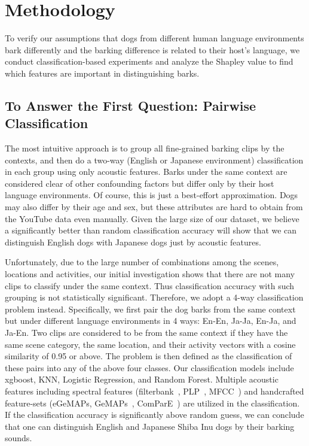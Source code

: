 \section{Methodology}
\label{sec:method}
To verify our assumptions that dogs from different human language environments bark differently and the barking difference is related to their host's language, we conduct classification-based experiments and analyze the Shapley value to find which features are important in distinguishing barks. %

\subsection{To Answer the First Question: Pairwise Classification}

The most intuitive approach is to group all fine-grained barking clips by the contexts, and then
do a two-way (English or Japanese environment) classification in each group using only 
acoustic features.  Barks under the same context are considered clear of other 
confounding factors but differ only by their host language environments. 
Of course, this is just a best-effort approximation. Dogs may also differ by their
age and sex, but these attributes are hard to obtain from the YouTube data even manually.
Given the large size of our dataset, we believe a significantly better than random classification
accuracy will show that we can distinguish English dogs with Japanese dogs just 
by acoustic features.  

Unfortunately, due to the large number of combinations among the scenes, locations and 
activities, our initial investigation shows that there are not many clips to classify 
under the same context. Thus classification accuracy with such grouping is not statistically 
significant. Therefore, we adopt a 4-way classification problem instead. Specifically, we first pair the dog barks from the same context but under different language environments in 4 ways: En-En, Ja-Ja, En-Ja, and Ja-En. Two clips are considered to be from the same context if they have the same scene category, the same location, and their activity vectors with a cosine similarity of 0.95 or above. The problem is then defined as the classification of these pairs into any of the above four classes. Our classification models include xgboost, KNN, Logistic Regression, and Random Forest. Multiple acoustic features including spectral features (filterbank~\cite{strang1996wavelets}, PLP~\cite{hermansky1990perceptual}, MFCC~\cite{davis1980comparison}) and handcrafted feature-sets (eGeMAPs, GeMAPs~\cite{eyben2015geneva}, ComParE~\cite{schuller2013interspeech}) are utilized in the classification. If the classification accuracy is significantly above random guess, we can conclude that one can distinguish English and Japanese Shiba Inu dogs by their barking sounds.

